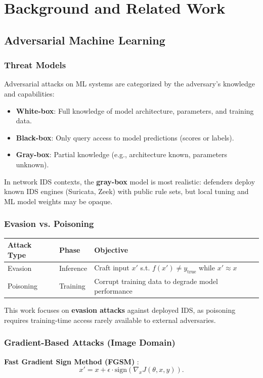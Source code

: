 \documentclass[review]{elsarticle}
\begin{document}
\section{Background and Related Work}
\label{sec:background}

\subsection{Adversarial Machine Learning}
\subsubsection{Threat Models}
Adversarial attacks on ML systems are categorized by the adversary's knowledge and capabilities:
\begin{itemize}
\item \textbf{White-box}: Full knowledge of model architecture, parameters, and training data.
\item \textbf{Black-box}: Only query access to model predictions (scores or labels).
\item \textbf{Gray-box}: Partial knowledge (e.g., architecture known, parameters unknown).
\end{itemize}
In network IDS contexts, the \textbf{gray-box} model is most realistic: defenders deploy known IDS engines (Suricata, Zeek) with public rule sets, but local tuning and ML model weights may be opaque.

\subsubsection{Evasion vs. Poisoning}
\begin{table}[htbp]
\small
\centering
\renewcommand{\arraystretch}{1.2}
\begin{tabular}{|l|l|p{6.2cm}|}
\hline
\textbf{Attack Type} & \textbf{Phase} & \textbf{Objective} \\
\hline
Evasion & Inference & Craft input $x'$ s.t. $f(x') \neq y_{\text{true}}$ while $x' \approx x$ \\
Poisoning & Training & Corrupt training data to degrade model performance \\
\hline
\end{tabular}
\end{table}
This work focuses on \textbf{evasion attacks} against deployed IDS, as poisoning requires training-time access rarely available to external adversaries.

\subsubsection{Gradient-Based Attacks (Image Domain)}
\textbf{Fast Gradient Sign Method (FGSM)} \cite{goodfellow2015explaining}:
\[
x' = x + \epsilon \cdot \text{sign}(\nabla_x J(\theta, x, y)).
\]
\end{document}
